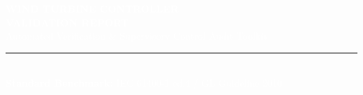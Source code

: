\documentclass[10pt,a4paper]{article}
\begin{document}
\begin{tcolorbox}[colback=NavyBlue,colframe=NavyBlue,arc=2mm,boxrule=1pt]
\begin{center}
    \vspace{0.3cm}
    {\Huge \textbf{\textcolor{white}{WIND TURBINE CONTROLLER}}}\\[0.2cm]
    {\Huge \textbf{\textcolor{white}{VALIDATION REPORT}}}\\[0.4cm]
    {\large \textcolor{white}{Automated Verification \& Supervisory Control Audit Toolkit}}\\[0.2cm]
    \textcolor{white}{\rule{0.8\textwidth}{0.5pt}}\\[0.3cm]
    {\normalsize \textcolor{white}{\textbf{Standard Benchmark:} IEC 61400-1 ed.4 / GL Guideline 2010}}
    \vspace{0.3cm}
\end{center}
\end{tcolorbox}

\vspace{0.5cm}
\end{document}
